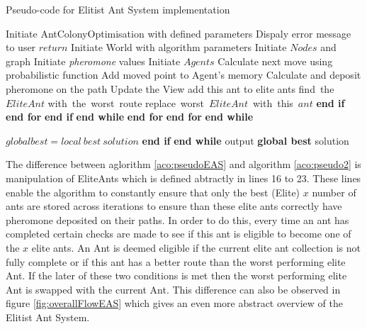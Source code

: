 \begin{algorithm}[H]
\caption{Pseudo-code for Elitist Ant System implementation}
\label{aco:pseudoEAS}
\begin{algorithmic}[1]
\State Initiate AntColonyOptimisation with defined parameters
\State Dispaly error message to user
\State $return$
\EndIf
\State Initiate World with algorithm parameters
\State Initiate $Nodes$ and graph
\State Initiate \textit{pheromone} values
\State Initiate $Agents$
\State Calculate next move using probabilistic function 
\State Add moved point to Agent's memory
\State Calculate and deposit pheromone on the path
\State Update the View
\EndWhile 
{}
\State add this ant to elite ants
\Else 
{}
\State find\ the\ $Elite Ant$ with\ the\ worst\ route
\State replace\ worst\ $Elite Ant$\ with\ this\ $ant$ 
\EndIf
\State \textbf{end if} 
\EndFor 
\State \textbf{end for}
\EndIf 
\State \textbf{end if}
\State 
\State \textbf{end while}
\EndFor 
\State \textbf{end for}
\State \textbf{end for}
\EndWhile 
\State \textbf{end while}

\State $global best = local\ best\ solution$
\EndIf
\State \textbf{end if}
\State \textbf{end while}
\State output \textbf{global best} solution
\end{algorithmic}
\end{algorithm}

The difference between aglorithm \ref{aco:pseudoEAS} and algorithm \ref{aco:pseudo2} is manipulation of EliteAnts which is defined abtractly in lines 16 to 23. These lines enable the algorithm to constantly ensure that only the best (Elite) $x$ number of ants are stored across iterations to ensure than these elite ants correctly have pheromone deposited on their paths. In order to do this, every time an ant has completed certain checks are made to see if this ant is eligible to become one of the $x$ elite ants. An Ant is deemed eligible if the current elite ant collection is not fully complete or if this ant has a better route than the worst performing elite Ant. If the later of these two conditions is met then the worst performing elite Ant is swapped with the current Ant. This difference can also be observed in figure \ref{fig:overallFlowEAS} which gives an even more abstract overview of the Elitist Ant System.

